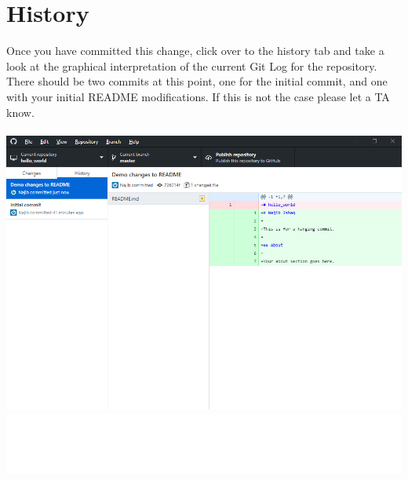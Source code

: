 \documentclass[12pt, letter]{article}
\begin{document}
    \section{History}
    Once you have committed this change, click over to the history tab and take a look at the graphical interpretation of the current Git Log for the repository. There should be two commits at this point, one for the initial commit, and one with your initial README modifications. If this is not the case please let a TA know. \\ \\ %
    \includegraphics{screenshots/shot5.bmp}
    \includegraphics{screenshots/shot05.bmp}
\end{document}
